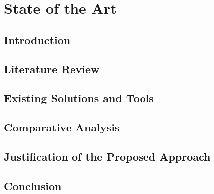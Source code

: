 \chapter{State of the Art}
\label{chap:sota}

\section{Introduction}

\section{Literature Review}

\section{Existing Solutions and Tools}

\section{Comparative Analysis}

\section{Justification of the Proposed Approach}

\section{Conclusion}
